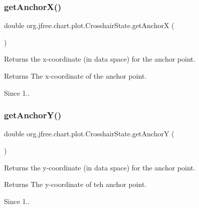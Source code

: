 \subsubsection{\texorpdfstring{get\+Anchor\+X()}{getAnchorX()}}
{\footnotesize\ttfamily double org.\+jfree.\+chart.\+plot.\+Crosshair\+State.\+get\+AnchorX (\begin{DoxyParamCaption}{ }\end{DoxyParamCaption})}

Returns the x-\/coordinate (in data space) for the anchor point.

\begin{DoxyReturn}{Returns}
The x-\/coordinate of the anchor point.
\end{DoxyReturn}
\begin{DoxySince}{Since}
1.. 
\end{DoxySince}
\mbox{\label{classorg_1_1jfree_1_1chart_1_1plot_1_1_crosshair_state_a23835ba0d35f316d6379a748e920f9c0}} 
\subsubsection{\texorpdfstring{get\+Anchor\+Y()}{getAnchorY()}}
{\footnotesize\ttfamily double org.\+jfree.\+chart.\+plot.\+Crosshair\+State.\+get\+AnchorY (\begin{DoxyParamCaption}{ }\end{DoxyParamCaption})}

Returns the y-\/coordinate (in data space) for the anchor point.

\begin{DoxyReturn}{Returns}
The y-\/coordinate of teh anchor point.
\end{DoxyReturn}
\begin{DoxySince}{Since}
1.. 
\end{DoxySince}
\mbox{\label{classorg_1_1jfree_1_1chart_1_1plot_1_1_crosshair_state_a5d99b61ddb5a034c610e2ed763f1d266}} 
